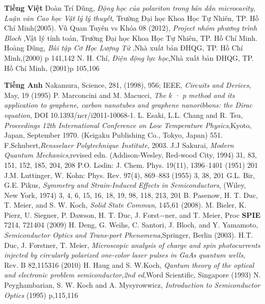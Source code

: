 \begin{thebibliography}{99}
\item[]\textbf{Tiếng Việt}
Đoàn Trí Dũng, \textit{Động học của polariton trong bán dẫn microcavity, Luận văn Cao học Vật lý lý thuyết}, Trường Đại học Khoa Học Tự Nhiên, TP. Hồ Chí Minh(2005).
Vũ Quan Tuyên vs Khóa 08 (2012), \textit{Project nhóm phương trình  Bloch },Vật lý tính toán, Trường Đại học Khoa Học Tự Nhiên, TP. Hồ Chí Minh.
 Hoàng Dũng, \textit{Bài tập Cơ Học Lượng Tử },Nhà xuất bản ĐHQG, TP. Hồ Chí Minh,(2000) p 141,142
 N. H. Chí, \textit{Điện động lực học},Nhà xuất bản ĐHQG, TP. Hồ Chí Minh, (2001)p 105,106
\item[]\textbf{Tiếng Anh}
Nakamura, Science, 281, (1998), 956; IEEE, \textit{ Circuits and Devices}, May, 19 (1995)
P. Marconcini and M. Macucci, \textit{The k · p method and its application to graphene, carbon nanotubes and graphene nanoribbons: the Dirac equation}, DOI 10.1393/ncr/i2011-10068-1.
L. Esaki, L.L. Chang and R. Tsu, \textit{Proceedings 12th International
Conference on Low Temperature Physics},Kyoto, Japan, September
1970. (Keigaku Publishing Co., Tokyo, Japan) 551.
F.Schubert,\textit{Rensselaer Polytechnique Institute}, 2003.
J.J Sakurai, \textit{Modern Quantum Mechanics},revised edn. (Addison-Wesley, Red-wood City, 1994) 31, 83, 151, 152, 185, 204, 208
P.O. L$\ddot{o}$din: J. Chem. Phys. 19(11), 1396–1401 (1951) 201
J.M. Luttinger, W. Kohn: Phys. Rev. 97(4), 869–883 (1955) 3, 38, 201
G.L. Bir, G.E. Pikus, \textit{Symmetry and Strain-Induced Effects in Semiconductors}, (Wiley, New York, 1974) 3, 4, 6, 15, 16, 18, 19, 98, 118, 213, 201
B. Pasenow, H. T. Duc, T. Meier, and S. W. Koch, 
\textit{Solid State Commun}, 145,61 (2008).
M. Bieler, K. Pierz, U. Siegner, P. Dawson, H. T. Duc, J. F$\ddot{o}$rst$-$ner, and T. Meier, Proc
\textbf{SPIE} 7214, 721404 (2009)
H. Deng, G. Weihs, C. Santori, J. Bloch, and Y. Yamamoto, \textit{Semiconductor Optics and Trans-port Phenomena},Springer, Berlin (2003).
H.T. Duc, J. F$\ddot{o}$rstner, T. Meier,
\textit{Microscopic analysis of charge and spin photocurrents injected by circularly polarized one-color laser pulses in GaAs quantum wells}, Rev. B 82,115316 (2010)
H. Haug and S. W.Koch, \textit{Qantum theory of the optical and electronic problem semiconductor,2nd ed},Word Scientific, Singapore (1993)
N. Peyghambarian, S. W. Koch and A. Mysyrowwicz, \textit{Introduction to Semiconductor Optics} (1995) p,115,116

\end{thebibliography}
